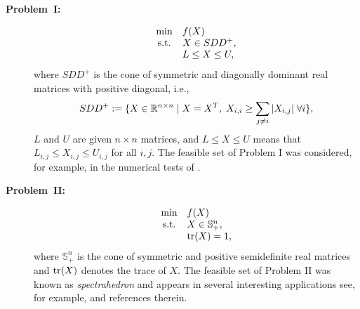 \begin{description}
	\item[{\bf Problem~I:}]
		\begin{equation*} \label{sdd}
			\begin{array}{cl}
				\displaystyle\min     & f(X)           \\
				\mbox{s.t.} & X \in SDD^+,   \\
				            & L\leq X\leq U,
			\end{array}
		\end{equation*}
		where $SDD^+$ is the cone of symmetric and diagonally dominant real matrices with positive diagonal, i.e.,
		$$SDD^+ :=\{X\in\mathbb{R}^{n\times n}\mid X=X^T, \; X_{i,i}\geq \displaystyle\sum_{j\neq i}|X_{i,j}| \; \forall i\},$$
		$L$ and $U$ are given $n\times n$ matrices, and  $L\leq X\leq U$ means that $L_{i,j} \leq X_{i,j} \leq U_{i,j}$ for all $i,j$.
		The feasible set of Problem I was considered, for example, in the numerical tests of \cite{BirginMartinezRaydan2003}.

	\item[{\bf Problem~II:}]
		\begin{equation*} \label{spec}
			\begin{array}{cl}
				\displaystyle\min     & f(X)                  \\
				\mbox{s.t.} & X \in \mathbb{S}^n_+, \\
				            & \textrm{tr}(X)=1,
			\end{array}
		\end{equation*}
		where $\mathbb{S}^n_+$ is the cone of symmetric and positive semidefinite real matrices and $\textrm{tr}(X)$ denotes the trace of $X$.
		The feasible set of Problem II was known as {\it spectrahedron} and appears in several interesting applications see, for example, \cite{allen2017linear,douglasprojected} and references therein.
\end{description}


